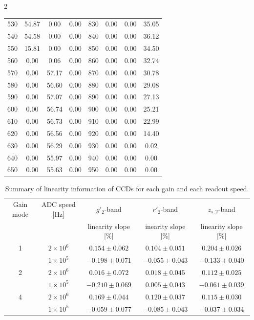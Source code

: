 \documentclass[a4paper,12pt]{spieman}  %
\begin{document}
\begin{spacing}{2}
\begin{table}
\begin{center}
\begin{tabular}{cccccccc}
530	&	54.87 	&	0.00 	&	0.00 	&	830	&	0.00 	&	0.00 	&	35.05 	\\
540	&	54.58 	&	0.00 	&	0.00 	&	840	&	0.00 	&	0.00 	&	36.12 	\\
550	&	15.81 	&	0.00 	&	0.00 	&	850	&	0.00 	&	0.00 	&	34.50 	\\
560	&	0.00 	&	0.06 	&	0.00 	&	860	&	0.00 	&	0.00 	&	32.74 	\\
570	&	0.00 	&	57.17 	&	0.00 	&	870	&	0.00 	&	0.00 	&	30.78 	\\
580	&	0.00 	&	56.60 	&	0.00 	&	880	&	0.00 	&	0.00 	&	29.08 	\\
590	&	0.00 	&	57.07 	&	0.00 	&	890	&	0.00 	&	0.00 	&	27.13 	\\
600	&	0.00 	&	56.74 	&	0.00 	&	900	&	0.00 	&	0.00 	&	25.21 	\\
610	&	0.00 	&	56.73 	&	0.00 	&	910	&	0.00 	&	0.00 	&	22.99 	\\
620	&	0.00 	&	56.56 	&	0.00 	&	920	&	0.00 	&	0.00 	&	14.40 	\\
630	&	0.00 	&	56.29 	&	0.00 	&	930	&	0.00 	&	0.00 	&	0.02 	\\
640	&	0.00 	&	55.97 	&	0.00 	&	940	&	0.00 	&	0.00 	&	0.00 	\\
650	&	0.00 	&	55.63 	&	0.00 	&	950	&	0.00 	&	0.00 	&	0.00 	\\
\hline
\end{tabular}
\end{center}
\end{table}


\begin{table}
\caption{
\label{linearity}
Summary of linearity information of CCDs for each gain and each readout speed.
}
\begin{center}
\begin{tabular}{ccccc}
\hline \hline
Gain mode&ADC speed [Hz]& $g'_2$-band & $r'_2$-band & $z_{s,2}$-band\\
&&linearity slope [\%]&inearity slope [\%]&linearity slope [\%]\\
\hline
1&$2\times 10^6$& $0.154 \pm 0.062$ & $0.104 \pm 0.051$ & $0.204 \pm 0.026$ \\
&$1\times 10^5$& $-0.198 \pm 0.071$ & $-0.055 \pm 0.043$ & $-0.133 \pm 0.040$ \\
2&$2\times 10^6$& $0.016 \pm 0.072$ & $0.018 \pm 0.045$ & $0.112 \pm 0.025$ \\
&$1\times 10^5$& $-0.210 \pm 0.069$ & $0.005 \pm 0.043$ & $-0.061 \pm 0.039$ \\
4&$2\times 10^6$& $0.169 \pm 0.044$ & $0.120 \pm 0.037$ & $0.115 \pm 0.030$ \\
&$1\times 10^5$& $-0.059 \pm 0.077$ & $-0.085 \pm 0.043$ & $-0.037 \pm 0.034$ \\
\hline
\end{tabular}
\end{center}
\end{table}


\end{spacing}
\end{document}
